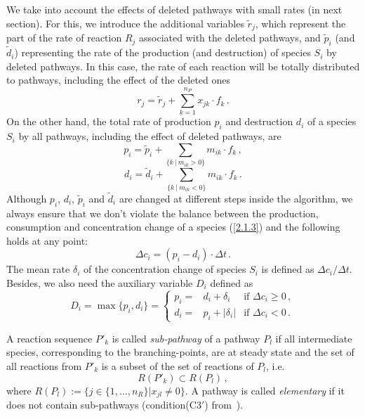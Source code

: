We take into account the effects of deleted pathways with small rates (in next section). For this, we introduce the additional variables $\tilde{r}_j$, which represent the part of the rate of reaction $R_j$ associated with the deleted pathways, and $\tilde{p}_i$ (and $\tilde{d}_i$) representing the rate of the production (and destruction) of species $S_i$ by deleted pathways. In this case, the rate of each reaction will be totally distributed to pathways, including the effect of the deleted ones
\begin{equation}
r_j = \tilde{r}_j + \sum_{k = 1}^{n_P} x_{jk}\cdot f_k\,.
\label{2.2.2}
\end{equation}
On the other hand, the total rate of production $p_i$ and destruction $d_i$ of a species $S_i$ by all pathways, including the effect of deleted pathways, are
\begin{equation}
p_i = \tilde{p}_i + \sum_{\{k\ |\ m_{ik}>0\}} m_{ik}\cdot f_k\,,
\label{2.2.3}
\end{equation}
\begin{equation}
d_i = \tilde{d}_i + \sum_{\{k\ |\ m_{ik}<0\}} m_{ik}\cdot f_k\,.
\label{2.2.4}
\end{equation}
Although $p_i$, $d_i$, $\tilde{p}_i$ and $\tilde{d}_i$ are changed at different steps inside the algorithm, we always ensure that we don't violate the balance between the production, consumption and concentration change of a species (\ref{2.1.3}) and the following holds at any point:
\begin{equation}
\Delta c_i =  (p_i - d_i)\cdot\Delta t\,.
\label{2.2.5}
\end{equation}
The mean rate $\delta_i$ of the concentration change of species $S_i$ is defined as $\Delta c_i/  \Delta t$. Besides, we also need the auxiliary variable $D_i$ defined as
\begin{equation}
D_i = \max\{p_i,d_i\}= \left\{\begin{array}{ccc}p_i =  & d_i + \delta_i & \textrm{if }\Delta c_i \geqslant 0\,, \\d_i =  & p_i + |\delta_i| & \textrm{if }\Delta c_i < 0\,. \end{array}\right.
\label{2.2.6}
\end{equation}

A reaction sequence $P' _k$ is called \textit{sub-pathway} of a pathway $P_l$ if all intermediate species, corresponding to the branching-points, are at steady state and the set of all reactions from $P' _k$ is a subset of the set of reactions of $P_l$, i.e.
\begin{equation}
R(P'_k)\subset R(P_l)\,, 
\label{2.2.7}
\end{equation}
where $R(P_l) := \{j\in \{1,\ldots,n_R\}|x_{jl}\neq 0\}$. A pathway is called \textit{elementary} if it does not contain sub-pathways (condition(C3$'$) from~\cite{Schuster2002}).

